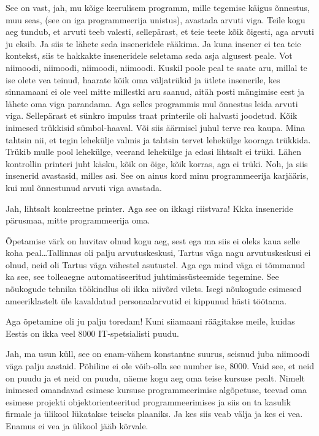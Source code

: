 See on vast, jah, mu kõige keerulisem programm, mille tegemise käigus õnnestus, 
muu seas, (see on iga programmeerija unistus), avastada arvuti viga. Teile kogu 
aeg tundub, et arvuti teeb valesti, sellepärast, et teie teete kõik õigesti, 
aga arvuti ju eksib. Ja siis te lähete seda inseneridele rääkima. Ja kuna 
insener ei tea teie kontekst, siis te hakkakte inseneridele seletama seda asja 
algusest peale. Vot niimoodi, niimoodi, niimoodi, niimoodi. Kuskil poole peal 
te saate aru, millal te ise olete vea teinud, haarate kõik oma väljatrükid ja 
ütlete insenerile, kes sinnamaani ei ole veel mitte millestki aru saanud, aitäh 
posti mängimise eest ja lähete oma viga parandama. Aga selles programmis mul 
õnnestus leida arvuti viga. Sellepärast et sünkro impulss traat printerile oli 
halvasti joodetud. Kõik inimesed trükkisid sümbol-haaval. Või siis äärmisel 
juhul terve rea kaupa. Mina tahtsin nii, et tegin lehekülje valmis ja tahtsin 
tervet lehekülge kooraga trükkida. Trükib mulle pool lehekülge, veerand 
lehekülge ja edasi lihtsalt ei trüki. Lähen kontrollin printeri juht käsku, 
kõik on õige, kõik korras, aga ei trüki. Noh, ja siis insenerid avastasid, 
milles asi. See on ainus kord minu programmeerija karjääris, kui mul õnnestunud 
arvuti viga avastada. 


Jah, lihtsalt konkreetne printer. Aga see on ikkagi riistvara! Kkka inseneride 
pärusmaa, mitte  programmeerija oma.


Õpetamise värk on huvitav olnud kogu aeg, sest ega ma siis ei oleks kaua selle 
koha peal\ldots Tallinnas oli palju arvutuskeskusi, Tartus väga nagu 
arvutuskeskusi ei olnud, neid oli Tartus väga vähestel asutustel. Aga ega mind 
väga ei tõmmanud ka see, see tolleaegne  automatiseeritud juhtimissüsteemide 
tegemine. See nõukogude tehnika töökindlus oli ikka niivõrd vilets. Isegi 
nõukogude esimesed ameeriklastelt üle kavaldatud personaalarvutid ei kippunud 
hästi töötama. 

Aga õpetamine oli ju palju toredam! Kuni siiamaani räägitakse meile, kuidas 
Eestis on ikka veel 8000 IT-spetsialisti puudu. 


Jah, ma usun küll, see on enam-vähem konstantne suurus, seisnud juba niimoodi 
väga palju aastaid. Põhiline ei ole võib-olla see number ise, 8000. Vaid see, 
et neid on puudu ja et neid on puudu,  näeme kogu aeg oma teise kursuse pealt. 
Nimelt inimesed omandavad esimese kursuse programmeerimise algõpetuse, teevad 
oma esimese projekti objektorienteeritud programmeerimises ja siis on ta 
kasulik firmale ja ülikool lükatakse teiseks plaaniks. Ja kes siis veab välja 
ja kes ei vea. Enamus ei vea ja ülikool jääb kõrvale. 

